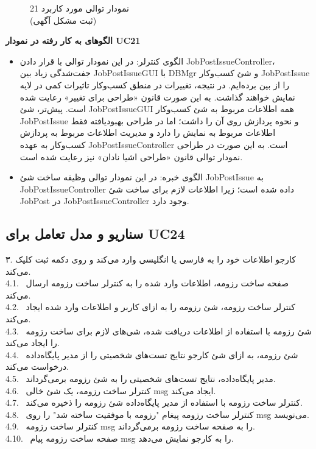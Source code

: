 \documentclass[12pt]{article}
\begin{document}
	\begin{figure}[H]
		\centering
		\caption{نمودار توالی مورد کاربرد 21\\
			(ثبت مشکل آگهی)
		}
		\label{fig:sd-uc21}
	\end{figure}


	\textbf{الگوهای به کار رفته در نمودار UC21}
	\begin{itemize}
		\item
		الگوی کنترلر: در این نمودار توالی با قرار دادن JobPostIssueController، جفت‌شدگی زیاد بین JobPostIssueGUI با DBMgr و شئ کسب‌وکار JobPostIssue را از بین برده‌ایم. در نتیجه، تغییرات در منطق کسب‌وکار تاثیرات کمی در لایه نمایش خواهند گذاشت. به این صورت قانون «طراحی برای تغییر» رعایت شده است. پیش‌تر، شئ JobPostIssueGUI همه اطلاعات مربوط به شئ کسب‌وکار JobPostIssue و نحوه پردازش روی آن‌ را داشت؛ اما در طراحی بهبود‌یافته فقط اطلاعات مربوط به نمایش را دارد و مدیریت اطلاعات مربوط به پردازش کسب‌و‌کار به عهده JobPostIssueController است. به این صورت در طراحی نمودار توالی قانون «طراحی اشیا نادان» نیز رعایت شده است.
		\item
		الگوی خبره: در این نمودار توالی وظیفه ساخت شئ JobPostIssue به JobPostIssueController داده شده است؛ زیرا اطلاعات لازم برای ساخت شئ JobPost در  JobPostIssueController وجود دارد.
	\end{itemize}

	\newpage
	\subsection{سناریو و مدل تعامل برای UC24}
	۳. کارجو اطلاعات خود را به فارسی یا انگلیسی وارد می‌کند و روی دکمه ثبت کلیک می‌کند.\\
	4.1. \ صفحه ساخت رزومه، اطلاعات وارد شده را به کنترلر ساخت رزومه ارسال می‌کند.\\
	4.2. \ کنترلر ساخت رزومه، شئ رزومه را به ازای کاربر و اطلاعات وارد شده ایجاد می‌کند.\\
	4.3. \ شئ رزومه با استفاده از اطلاعات دریافت شده، شی‌های لازم برای ساخت رزومه را ایجاد می‌کند.\\
	4.4. \ شئ رزومه، به ازای شئ کارجو نتایج تست‌های شخصیتی را از مدیر پایگاه‌داده درخواست می‌کند.\\
	4.5. \ مدیر پایگاه‌داده، نتایج تست‌های شخصیتی را به شئ رزومه برمی‌گرداند.\\
	4.6. \ کنترلر ساخت رزومه، یک شئ خالی msg ایجاد می‌کند.\\
	4.7. \ کنترلر ساخت رزومه با استفاده از مدیر پایگاه‌داده شئ رزومه را ذخیره می‌کند.\\
	4.8. \ کنترلر ساخت رزومه پیغام "رزومه با موفقیت ساخته شد" را روی msg می‌نویسد.\\
	4.9. \ کنترلر ساخت رزومه msg را به صفحه ساخت رزومه برمی‌گرداند.\\
	4.10. \ صفحه ساخت رزومه پیام msg را به کارجو نمایش می‌دهد.
\end{document}
